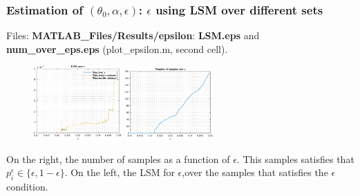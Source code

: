 \documentclass[aspectratio=169]{beamer}\usepackage[utf8]{inputenc}
\begin{document}
\begin{frame}\frametitle{Estimation of $(\theta_0,\alpha,\epsilon)$: $\epsilon$ using LSM over different sets}

Files: \textbf{MATLAB\_Files/Results/epsilon}: \textbf{LSM.eps} and \textbf{num\_over\_eps.eps} (plot\_epsilon.m, second cell).\\

\begin{figure}[ht!]
\centering
\includegraphics[width=0.3\textwidth]{../../MATLAB_Files/Results/epsilon/LSM.eps}\quad\quad
\includegraphics[width=0.3\textwidth]{../../MATLAB_Files/Results/epsilon/num_over_eps.eps}
\end{figure}

On the right, the number of samples as a function of $\epsilon$. This samples satisfies that $p_i^\epsilon\in\{\epsilon,1-\epsilon\}$. On the left, the LSM for $\epsilon$,over the samples that satisfies the $\epsilon$ condition.

\end{frame}

\end{document}
